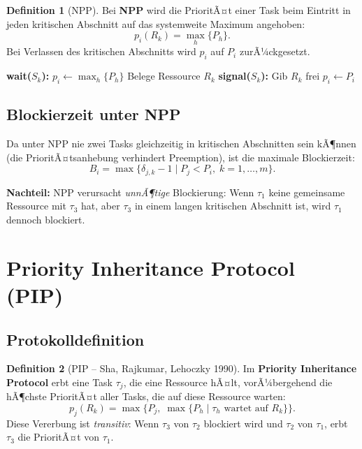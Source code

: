 ﻿\documentclass[a4paper,12pt]{report}
\theoremstyle{definition}
\newtheorem{definition}{Definition}[chapter]
\begin{document}
\begin{definition}[NPP]
	Bei \textbf{NPP} wird die PrioritÃ¤t einer Task beim Eintritt in jeden
	kritischen Abschnitt auf das systemweite Maximum angehoben:
	\[
		p_i(R_k) = \max_h \{P_h\}.
	\]
	Bei Verlassen des kritischen Abschnitts wird $p_i$ auf $P_i$ zurÃ¼ckgesetzt.
\end{definition}

\begin{algorithm}[H]
	\caption{Non-Preemptive Protocol (NPP)}
	\begin{algorithmic}[1]
		\State \textbf{wait($S_k$):}
		\State $p_i \leftarrow \max_h\{P_h\}$ 
		\State Belege Ressource $R_k$
		\State
		\State \textbf{signal($S_k$):}
		\State Gib $R_k$ frei
		\State $p_i \leftarrow P_i$ 
	\end{algorithmic}
\end{algorithm}

\subsection{Blockierzeit unter NPP}

Da unter NPP nie zwei Tasks gleichzeitig in kritischen Abschnitten sein kÃ¶nnen
(die PrioritÃ¤tsanhebung verhindert Preemption), ist die maximale Blockierzeit:
\[
	B_i = \max\{\delta_{j,k} - 1 \mid P_j < P_i,\; k=1,\ldots,m\}.
\]

\textbf{Nachteil:} NPP verursacht \emph{unnÃ¶tige} Blockierung: Wenn $\tau_1$ keine
gemeinsame Ressource mit $\tau_3$ hat, aber $\tau_3$ in einem langen kritischen
Abschnitt ist, wird $\tau_1$ dennoch blockiert.

\section{Priority Inheritance Protocol (PIP)}

\subsection{Protokolldefinition}

\begin{definition}[PIP -- Sha, Rajkumar, Lehoczky 1990]
	Im \textbf{Priority Inheritance Protocol} erbt eine Task $\tau_j$, die eine
	Ressource hÃ¤lt, vorÃ¼bergehend die hÃ¶chste PrioritÃ¤t aller Tasks, die auf diese
	Ressource warten:
	\[
		p_j(R_k) = \max\bigl\{P_j,\; \max\{P_h \mid \tau_h \text{ wartet auf } R_k\}\bigr\}.
	\]
	Diese Vererbung ist \emph{transitiv}: Wenn $\tau_3$ von $\tau_2$ blockiert wird
	und $\tau_2$ von $\tau_1$, erbt $\tau_3$ die PrioritÃ¤t von $\tau_1$.
\end{definition}
\end{document}
